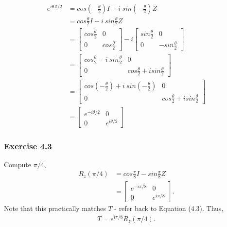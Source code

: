 \begin{align}
    e^{i \theta Z / 2} &= cos( - \frac \theta 2) I + i\ sin( - \frac \theta 2) Z \\
    &= cos \frac \theta 2 I - i\ sin \frac \theta 2 Z \\
    &= \left[ \begin{matrix} cos \frac \theta 2 & 0 \\ 0 & cos \frac \theta 2 \end{matrix} \right] - i
        \left[ \begin{matrix} sin \frac \theta 2 & 0 \\ 0 & - sin \frac \theta 2\end{matrix} \right] \\
    &= \left[ \begin{matrix} cos \frac \theta 2 - i\ sin \frac \theta 2 & 0 \\
        0 & cos \frac \theta 2 + i sin \frac \theta 2 \end{matrix} \right] \\
    &= \left[ \begin{matrix} cos(- \frac \theta 2) + i\ sin(- \frac \theta 2) & 0 \\
        0 & cos \frac \theta 2 + i sin \frac \theta 2 \end{matrix} \right] \\
    &= \left[ \begin{matrix} e^{-i \theta/2} & 0 \\ 0 & e^{i \theta/2} \end{matrix} \right]
\end{align}


\subsubsection{Exercise 4.3}
Compute $\pi/4$,
\begin{align}
    R_z(\pi/4) &= cos \frac{\pi}{8} I - sin \frac{\pi}{8} Z \\
    &= \left[ \begin{matrix} e^{-i \pi/8} & 0 \\ 0 & e^{i \pi/8} \end{matrix} \right].
\end{align}
Note that this practically matches $T$ - refer back to Equation (4.3).
Thus,
\begin{align}
    T = e^{i \pi/8} R_z(\pi/4).
\end{align}
